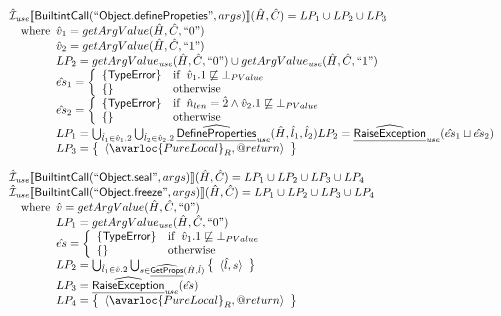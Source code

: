 \[
\begin{array}{l}


\aI_{\it use}\lbr \SF{BuiltintCall}(``\SF{Object.definePropeties}",args)\rbr(\hat{H},\hat{C}) = LP_1 \cup LP_2 \cup LP_3\\
\quad\wherec{
  \hat{v}_1 = getArgValue(\hat{H}, \hat{C}, ``0")\\
  \hat{v}_{2} = getArgValue(\hat{H},\hat{C}, ``1")\\
  LP_2 = getArgValue_{\it use}(\hat{H}, \hat{C}, ``0") \cup  getArgValue_{\it use}(\hat{H}, \hat{C}, ``1")\\
  \hat{es}_1 = \left\{\begin{array}{ll}
      \{ \SF{TypeError} \}
      & \ifc{\hat{v}_1.1 \not\sqsubseteq \bot_{PValue}}\\
      \set{} & \owc
    \end{array}\right.\\
  \hat{es}_2 = \left\{\begin{array}{ll}
      \{ \SF{TypeError} \}
      & \ifc{\hat{n}_{len} = \hat{2} \land \hat{v}_2.1 \not\sqsubseteq \bot_{PValue}}\\
      \set{} & \owc
    \end{array}\right.\\
  LP_1 = \bigcup_{\hat{l}_1 \in \hat{v}_1.2}\bigcup_{\hat{l}_2 \in \hat{v}_2.2} 
    \ahf{DefineProperties}_{\it use}(\hat{H}, \hat{l}_1, \hat{l}_2)
  LP_2 = \ahf{RaiseException}_{\it use}(\hat{es}_1 \sqcup \hat{es}_2)\\ 
  LP_3 = \set{\langle\avarloc{PureLocal}_R,\varprop{return}\rangle}\\
  }\\
\\




\aI_{\it use}\lbr \SF{BuiltintCall}(``\SF{Object.seal}",args)\rbr(\hat{H},\hat{C}) = LP_1 \cup LP_2 \cup LP_3 \cup LP_4\\
\aI_{\it use}\lbr \SF{BuiltintCall}(``\SF{Object.freeze}",args)\rbr(\hat{H},\hat{C}) = LP_1 \cup LP_2 \cup  LP_3 \cup LP_4\\
\quad\wherec{
  \hat{v} = getArgValue(\hat{H}, \hat{C}, ``0")\\
  LP_1 = getArgValue_{\it use}(\hat{H}, \hat{C}, ``0")\\
  \hat{es} = \left\{\begin{array}{ll}
      \{ \SF{TypeError} \}
      & \ifc{\hat{v}_1.1 \not\sqsubseteq \bot_{PValue}}\\
      \set{} & \owc
    \end{array}\right.\\
  LP_2 = \bigcup_{\hat{l}_1 \in \hat{v}.2} \bigcup_{s \in \ahf{GetProps}(\hat{H}, \hat{l})}  \set{\langle \hat{l}, s\rangle}\\
  LP_3 = \ahf{RaiseException}_{\it use}(\hat{es})\\ 
  LP_4 = \set{\langle\avarloc{PureLocal}_R,\varprop{return}\rangle}\\
  }\\
\\


\end{array}\]
